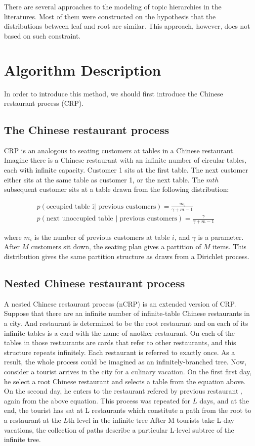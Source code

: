 \documentclass[a4paper]{article}
\begin{document}
There are several approaches to the modeling of topic hierarchies in the literatures. Most of them were constructed on the hypothesis that the distributions between leaf and root are similar. This approach, however, does not based on such constraint.

\section{Algorithm Description}
In order to introduce this method, we should first introduce the Chinese restaurant process (CRP). 
\subsection{The Chinese restaurant process}

CRP is an analogous to seating customers at tables in a Chinese restaurant. Imagine there is a Chinese restaurant with an infinite number of circular tables, each with infinite capacity. Customer 1 sits at the first table. The next customer either sits at the same table as customer 1, or the next table.  The $mth$ subsequent customer sits at a table drawn from the following
distribution: 

\begin{align}
p(\text{occupied table i| previous customers}) =  \frac{m_i}{\gamma+m-1}  \\ 
p(\text{next unoccupied table | previous customers}) = \frac{\gamma}{\gamma + m -1} &
\end{align}

where $m_i$ is the number of previous customers at table $i$, and $\gamma$ is a parameter. After $M$
customers sit down, the seating plan gives a partition of $M$ items. This distribution gives
the same partition structure as draws from a Dirichlet process.

\subsection{Nested Chinese restaurant process}

A nested Chinese restaurant process (nCRP) is an extended version of CRP. Suppose that there are an infinite number of infinite-table Chinese restaurants in a city. And restaurant is determined to be the root restaurant and on each of its infinite tables is a card
with the name of another restaurant. On each of the tables in those restaurants are cards that
refer to other restaurants, and this structure repeats infinitely. Each restaurant is referred to
exactly once. As a result, the whole process could be imagined as an infinitely-branched tree. Now, consider 
a tourist arrives in the city for a culinary vacation. On the first first day, he select a root
Chinese restaurant and selects a table from the equation above. On the second day, he enters to the
restaurant refered by previous restaurant , again from the above equation.
This process was repeated for $L$ days, and at the end, the tourist has sat at L restaurants
which constitute a path from the root to a restaurant at the $L$th level in the infinite tree
After M tourists take L-day vacations, the collection of paths describe a
particular L-level subtree of the infinite tree.
\end{document}
